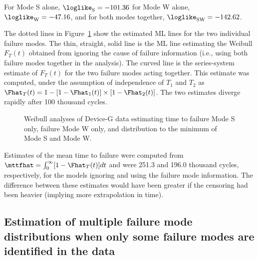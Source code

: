 \begin{example}
\begin{table}
\begin{tabular}{lcrrrr}
\end{tabular}
\begin{minipage}[t]{4in}
For Mode S alone, $\loglike_{\rm S}=-101.36$
for Mode W alone, $\loglike_{\rm W}=-47.16$, and for both modes
together,  $\loglike_{\rm SW}= -142.62$.
\label{table:deviceg.mles}
\end{minipage}
\end{table}
The dotted lines in Figure~\ref{figure:deviceg.crisk.comp2.ps} show
the estimated ML lines for the two individual failure modes.  The
thin, straight, solid line is the ML line estimating the Weibull
$F_{T}(t)$ obtained from ignoring the cause of failure information
(i.e., using both failure modes together in the analysis). The
curved line is the series-system estimate of $F_{T}(t)$ for the two
failure modes acting together. This estimate was computed, under the
assumption of independence of $T_{1}$ and $T_{2}$ as
$\Fhat_{T}(t)=1-[1-\Fhat_{1}(t)]\times [1-\Fhat_{2}(t)]$. The two
estimates diverge rapidly after 100 thousand cycles.
\begin{figure}
\caption{Weibull analyses of Device-G data 
estimating time to failure Mode S only, failure Mode W
only, and distribution to the minimum of Mode S and Mode W.}
\label{figure:deviceg.crisk.comp2.ps}
\end{figure}
Estimates of the mean time to failure were computed from
$\mttfhat=\int_{0}^{\infty}[1-\Fhat_{T}(t)]dt$ and were 251.3 and 196.0
thousand cycles, respectively, for the models ignoring and using
the failure mode information. The difference between these estimates
would have been greater if the censoring had been heavier (implying
more extrapolation in time).
\end{example}

\subsection{Estimation of multiple failure mode distributions
when only some failure modes are identified in the data}

